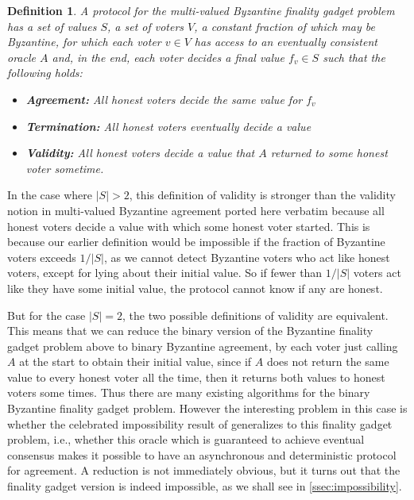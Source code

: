 \documentclass{article}
\newtheorem{definition}[theorem]{Definition}
\begin{document}
\begin{definition} A protocol for the {\em multi-valued Byzantine finality gadget problem} has a set of values $S$, a set of voters $V$, a constant fraction of which may be Byzantine, for which each voter $v \in V$ has access to an eventually consistent oracle $A$ and, in the end, each voter decides a final value $f_v \in S$ such that the following holds:

\begin{itemize}
\item {\bf Agreement:} All honest voters decide the same value for $f_v$
\item {\bf Termination:} All honest voters eventually decide a value
\item {\bf Validity:} All honest voters decide a value that $A$ returned to some honest voter sometime.
\end{itemize}

\end{definition}

In the case where $|S| > 2$, this definition of validity is stronger than the validity notion in multi-valued Byzantine agreement ported here verbatim because all honest voters decide a value with which some honest voter started. 
This is because our earlier definition would be impossible if the fraction of Byzantine voters exceeds $1/|S|$, as we cannot detect Byzantine voters who act like honest voters, except for lying about their initial value.
So if fewer than $1/|S|$ voters act like they have some initial value, the protocol cannot know if any are honest. 


But for the case $|S|=2$, the two possible definitions of validity are equivalent.
This means that we can reduce the binary version of the Byzantine finality gadget problem above to binary Byzantine agreement, by each voter just calling $A$ at the start to obtain their initial value, since if $A$ does not return the same value to every honest voter all the time, then it returns both values to honest voters some times.
Thus there are many existing algorithms for the binary Byzantine finality gadget problem.
However the interesting problem in this case is whether the celebrated impossibility result of \cite{flp} generalizes to this finality gadget problem, i.e., whether this oracle which is guaranteed to achieve eventual consensus makes it possible to have an asynchronous and deterministic protocol for agreement.
A reduction is not immediately obvious, but it turns out that the finality gadget version is indeed impossible, as we shall see in \ref{ssec:impossibility}.
\end{document}

